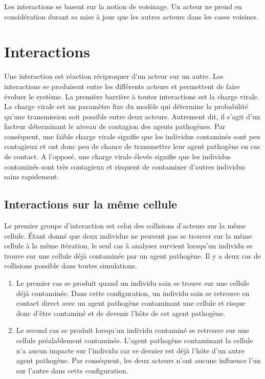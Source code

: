 Les interactions se basent sur la notion de voisinage. Un acteur ne prend en considération durant sa mise à jour que les autres acteurs dans les cases voisines.

\section{Interactions}

Une interaction est réaction réciproquer d'un acteur sur un autre. Les interactions se produisent entre les différents acteurs et permettent de faire évoluer le système. La première barrière à toutes interactions est la charge virale. La charge virale est un paramètre fixe du modèle qui détermine la probabilité qu'une transmission soit possible entre deux acteurs. Autrement dit, il s'agit d'un facteur déterminant le niveau de contagion des agents pathogènes. Par conséquent, une faible charge virale signifie que les individus contaminés sont peu contagieux et ont donc peu de chance de transmettre leur agent pathogène en cas de contact. A l'opposé, une charge virale élevée signifie que les individus contaminés sont très contagieux et risquent de contaminer d'autres individus sains rapidement.\\

\subsection{Interactions sur la même cellule}

Le premier groupe d'interaction est celui des collisions d'acteurs sur la même cellule. Étant donné que deux individus ne peuvent pas se trouver sur la même cellule à la même itération, le seul cas à analyser survient lorsqu'un individu se trouve sur une cellule déjà contaminée par un agent pathogène. Il y a deux cas de collisions possible dans toutes simulations.

\begin{enumerate}
	\item Le premier cas se produit quand un individu sain se trouve sur une cellule déjà contaminée. Dans cette configuration, un individu sain se retrouve en contact direct avec un agent pathogène contaminant une cellule et risque donc d'être contaminé et de devenir l'hôte de cet agent pathogène.
	\item Le second cas se produit lorsqu'un individu contaminé se retrouve sur une cellule préalablement contaminée. L'agent pathogène contaminant la cellule n'a aucun impacte sur l'individu car ce dernier est déjà l'hôte d'un autre agent pathogène. Par conséquent, les deux acteurs n'ont aucune influence l'un sur l'autre dans cette configuration.
\end{enumerate}

